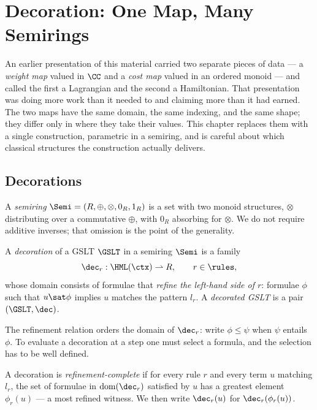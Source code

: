 \chapter{Decoration: One Map, Many Semirings}
\label{sec:weighted}

An earlier presentation of this material carried two separate pieces of
data --- a \emph{weight map} valued in $\CC$ and a \emph{cost map} valued
in an ordered monoid --- and called the first a Lagrangian and the second
a Hamiltonian.  That presentation was doing more work than it needed to
and claiming more than it had earned.  The two maps have the same domain,
the same indexing, and the same shape; they differ only in where they take
their values.  This chapter replaces them with a single construction,
parametric in a semiring, and is careful about which classical structures
the construction actually delivers.

\section{Decorations}

\begin{definition}[Semiring]
A \emph{semiring} $\Semi = (R, \oplus, \otimes, 0_R, 1_R)$ is a set with
two monoid structures, $\otimes$ distributing over a commutative $\oplus$,
with $0_R$ absorbing for $\otimes$.  We do not require additive inverses;
that omission is the point of the generality.
\end{definition}

\begin{definition}[Decoration]
\label{def:decoration}
A \emph{decoration} of a GSLT $\GSLT$ in a semiring $\Semi$ is a family
\[
  \dec_r : \HML(\ctx) \rightharpoonup R, \qquad r \in \rules,
\]
whose domain consists of formulae that \emph{refine the left-hand side of
$r$}: formulae $\phi$ such that $u \sat \phi$ implies $u$ matches the
pattern $l_r$.  A \emph{decorated GSLT} is a pair $(\GSLT, \dec)$.
\end{definition}

The refinement relation orders the domain of $\dec_r$: write
$\phi \leq \psi$ when $\psi$ entails $\phi$.  To evaluate a decoration at
a step one must select a formula, and the selection has to be well
defined.

\begin{definition}
\label{def:refcomplete}
A decoration is \emph{refinement-complete} if for every rule $r$ and every
term $u$ matching $l_r$, the set of formulae in $\mathrm{dom}(\dec_r)$
satisfied by $u$ has a greatest element $\phi_r(u)$ --- a most refined
witness.  We then write $\dec_r(u)$ for $\dec_r(\phi_r(u))$.
\end{definition}


